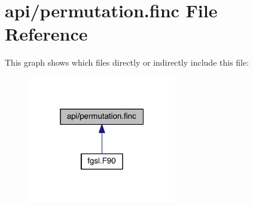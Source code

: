 \hypertarget{permutation_8finc}{\section{api/permutation.finc File Reference}
\label{permutation_8finc}
}
This graph shows which files directly or indirectly include this file\-:\nopagebreak
\begin{figure}[H]
\begin{center}
\leavevmode
\includegraphics[width=184pt]{permutation_8finc__dep__incl}
\end{center}
\end{figure}
